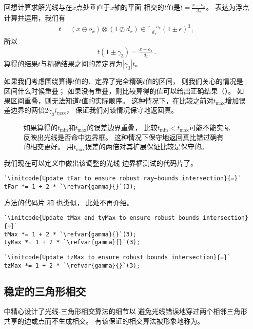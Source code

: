 回想计算求解光线与在$x$点处垂直于$x$轴的平面
相交的$t$值是$\displaystyle t=\frac{x-o_x}{d_x}$。
表达为浮点计算并运用，我们有
\begin{align*}
    t=(x\ominus o_x)\otimes(1\oslash d_x)\in\frac{x-o_x}{d_x}(1\pm\epsilon)^3\, ,
\end{align*}
所以
\begin{align*}
    t(1\pm\gamma_3)=\frac{x-o_x}{d_x}\, .
\end{align*}
算得的结果$t$与精确结果之间的差定界为$|\gamma_3|t$。

如果我们考虑围绕算得$t$值的、定界了完全精确$t$值的区间，
则我们关心的情况是区间什么时候重叠；
如果没有重叠，则比较算得的值可以给出正确结果（）。
如果区间重叠，则无法知道$t$值的实际顺序。
这种情况下，在比较之前对$t_{\max}$增加误差边界的两倍$2\gamma_3t_{\max}$，
保证我们对该情况保守地返回真。
\begin{figure}[htbp]
    \centering
    \caption{如果算得的$t_{\min}$和$t_{\max}$的误差边界重叠，
    比较$t_{\min}<t_{\max}$可能不能实际反映出光线是否命中边界框。
    这种情况下保守地返回真比错过确有的相交更好。
    用$t_{\max}$误差的两倍对其扩展保证比较是保守的。}
    \label{fig:3.42}
\end{figure}

我们现在可以定义中做出该调整的光线-边界框测试的代码片了。
\begin{lstlisting}
`\initcode{Update tFar to ensure robust ray–bounds intersection}{=}`
tFar *= 1 + 2 * `\refvar{gamma}{}`(3);
\end{lstlisting}

方法的代码片
和
也类似，
此处不再介绍。
\begin{lstlisting}
`\initcode{Update tMax and tyMax to ensure robust bounds intersection}{=}`
tMax *= 1 + 2 * `\refvar{gamma}{}`(3);
tyMax *= 1 + 2 * `\refvar{gamma}{}`(3);
\end{lstlisting}
\begin{lstlisting}
`\initcode{Update tzMax to ensure robust bounds intersection}{=}`
tzMax *= 1 + 2 * `\refvar{gamma}{}`(3);
\end{lstlisting}

\subsection{稳定的三角形相交}\label{sub:稳定的三角形相交}
中精心设计了光线-三角形相交算法的细节以
避免光线错误地穿过两个相邻三角形共享的边或点而不生成相交。
有该保证的相交算法被形象地称为。


